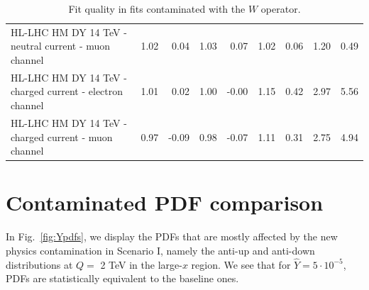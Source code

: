 \documentclass[withindex,glossary]{cam-thesis}
\begin{document}
\begin{table}[H]
\begin{tabular}{lrrrrrrrr}
HL-LHC HM DY 14 TeV - neutral current - muon channel & 1.02 & 0.04 & 1.03 & 0.07 & 1.02 & 0.06 & 1.20 & 0.49 \\
HL-LHC HM DY 14 TeV - charged current - electron channel & 1.01 & 0.02 & 1.00 & -0.00 & 1.15 & 0.42 & 2.97 & 5.56 \\
HL-LHC HM DY 14 TeV - charged current - muon channel & 0.97 & -0.09 & 0.98 & -0.07 & 1.11 & 0.31 & 2.75 & 4.94 \\
\bottomrule
\end{tabular}
\caption{\label{tab:chi2_w} Fit quality in fits contaminated with the $W$ operator.}
\end{table}



\chapter{Contaminated PDF comparison}
\label{app:pdfs}
In Fig.~\ref{fig:Ypdfs}, we display the PDFs that are mostly affected
by the new physics contamination in Scenario I, namely the anti-up and anti-down
distributions at $Q=$ 2 TeV in the large-$x$ region. We see that for
$\hat{Y} = 5\cdot 10^{-5}$, PDFs are statistically equivalent to the baseline ones.
\end{document}
